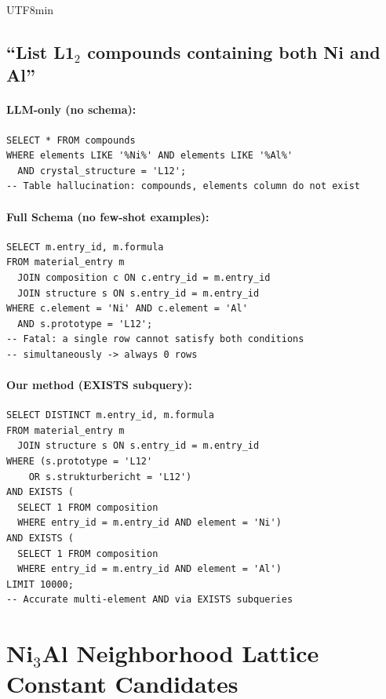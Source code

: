 \documentclass[sn-mathphys,Numbered]{sn-jnl}
\begin{document}
\begin{CJK}{UTF8}{min}
\subsection{``List L1$_2$ compounds containing both Ni and Al''}

\paragraph{LLM-only (no schema):}
\begin{lstlisting}[basicstyle=\ttfamily\scriptsize,breaklines=true]
SELECT * FROM compounds
WHERE elements LIKE '%Ni%' AND elements LIKE '%Al%'
  AND crystal_structure = 'L12';
-- Table hallucination: compounds, elements column do not exist
\end{lstlisting}

\paragraph{Full Schema (no few-shot examples):}
\begin{lstlisting}[basicstyle=\ttfamily\scriptsize,breaklines=true]
SELECT m.entry_id, m.formula
FROM material_entry m
  JOIN composition c ON c.entry_id = m.entry_id
  JOIN structure s ON s.entry_id = m.entry_id
WHERE c.element = 'Ni' AND c.element = 'Al'
  AND s.prototype = 'L12';
-- Fatal: a single row cannot satisfy both conditions
-- simultaneously -> always 0 rows
\end{lstlisting}

\paragraph{Our method (EXISTS subquery):}
\begin{lstlisting}[basicstyle=\ttfamily\scriptsize,breaklines=true]
SELECT DISTINCT m.entry_id, m.formula
FROM material_entry m
  JOIN structure s ON s.entry_id = m.entry_id
WHERE (s.prototype = 'L12'
    OR s.strukturbericht = 'L12')
AND EXISTS (
  SELECT 1 FROM composition
  WHERE entry_id = m.entry_id AND element = 'Ni')
AND EXISTS (
  SELECT 1 FROM composition
  WHERE entry_id = m.entry_id AND element = 'Al')
LIMIT 10000;
-- Accurate multi-element AND via EXISTS subqueries
\end{lstlisting}

\section{Ni$_3$Al Neighborhood Lattice Constant Candidates}
\label{sec:sup_lattice_match}


\end{CJK}
\end{document}
